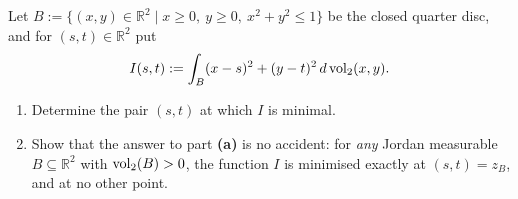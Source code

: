 \begin{exercise}
\label{ex:centroid_minimises_second_moment}
Let $B := \{(x,y) \in \mathbb{R}^2 \mid x \geq 0,\ y \geq 0,\ x^2+y^2 \leq 1\}$ be the closed
quarter disc, and for $(s,t) \in \mathbb{R}^2$ put
\[I(s,t) := \int_B (x-s)^2 + (y-t)^2 \,d\operatorname{vol}_2(x,y).\]
\begin{enumerate}[label=\textbf{(\alph*)}]
  \item Determine the pair $(s,t)$ at which $I$ is minimal.
  \item Show that the answer to part \textbf{(a)} is no accident: for \emph{any} Jordan
    measurable $B \subseteq \mathbb{R}^2$ with $\operatorname{vol}_2(B) > 0$, the function $I$ is minimised
    exactly at $(s,t) = z_B$, and at no other point.
\end{enumerate}
\end{exercise}
